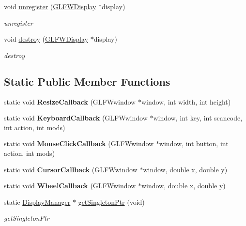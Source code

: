 \begin{DoxyCompactItemize}
void \hyperlink{classEngine_1_1DisplayManager_aea08e9c79832bc02db95950010d9af32}{unregister} (\hyperlink{classEngine_1_1GLFWDisplay}{G\+L\+F\+W\+Display} $\ast$display)
\begin{DoxyCompactList}\small\item\em unregister \end{DoxyCompactList}\item 
void \hyperlink{classEngine_1_1DisplayManager_a83ea413274fab221c8573ddaad077993}{destroy} (\hyperlink{classEngine_1_1GLFWDisplay}{G\+L\+F\+W\+Display} $\ast$display)
\begin{DoxyCompactList}\small\item\em destroy \end{DoxyCompactList}\end{DoxyCompactItemize}
\subsection*{Static Public Member Functions}
\begin{DoxyCompactItemize}
\item 
\hypertarget{classEngine_1_1DisplayManager_ad459645eef8d2167c2aef8859333272d}{}static void {\bfseries Resize\+Callback} (G\+L\+F\+Wwindow $\ast$window, int width, int height)\label{classEngine_1_1DisplayManager_ad459645eef8d2167c2aef8859333272d}

\item 
\hypertarget{classEngine_1_1DisplayManager_a3585e07cfd3e567462413443ff56d1e7}{}static void {\bfseries Keyboard\+Callback} (G\+L\+F\+Wwindow $\ast$window, int key, int scancode, int action, int mods)\label{classEngine_1_1DisplayManager_a3585e07cfd3e567462413443ff56d1e7}

\item 
\hypertarget{classEngine_1_1DisplayManager_adc6a19826fcbc1e753fd9428e7025c03}{}static void {\bfseries Mouse\+Click\+Callback} (G\+L\+F\+Wwindow $\ast$window, int button, int action, int mods)\label{classEngine_1_1DisplayManager_adc6a19826fcbc1e753fd9428e7025c03}

\item 
\hypertarget{classEngine_1_1DisplayManager_a92ea0a3076a42c05c16f680ddbf53135}{}static void {\bfseries Cursor\+Callback} (G\+L\+F\+Wwindow $\ast$window, double x, double y)\label{classEngine_1_1DisplayManager_a92ea0a3076a42c05c16f680ddbf53135}

\item 
\hypertarget{classEngine_1_1DisplayManager_a013abbca377130d25261b5ce3a74e32c}{}static void {\bfseries Wheel\+Callback} (G\+L\+F\+Wwindow $\ast$window, double x, double y)\label{classEngine_1_1DisplayManager_a013abbca377130d25261b5ce3a74e32c}

\item 
static \hyperlink{classEngine_1_1DisplayManager}{Display\+Manager} $\ast$ \hyperlink{classEngine_1_1DisplayManager_ae8f1ed1758ca054854fd224496a80b29}{get\+Singleton\+Ptr} (void)
\begin{DoxyCompactList}\small\item\em get\+Singleton\+Ptr \end{DoxyCompactList}\end{DoxyCompactItemize}


